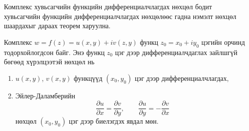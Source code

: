 Комплекс хувьсагчийн функцийн дифференциалчлагдах нөхцөл бодит хувьсагчийн функцийн дифференциалчлагдах нөхцөлөөс гадна нэмэлт нөхцөл шаардахыг дараах теорем харуулна.
\begin{thm}
Комплекс $w=f(z)=u(x,y)+iv (z,y)$ функц $z_0=x_0+iy_0$ цэгийн орчинд тодорхойлогдсон байг. Энэ функц $z_0$ цэг дээр дифференциалчдаглах зайлшгүй бөгөөд хүрэлцээтэй нөхцөл нь
\begin{enumerate}
    \item $u(x,y)$, $v(x,y)$ функцүүд $(x_0,y_0)$ цэг дээр дифференциалчлагдах,
    \item Эйлер-Даламберийн 
    \begin{equation}
\tag{E-D}
\dfrac{\partial u}{\partial x}=\dfrac{\partial v}{\partial y}, \qquad \dfrac{\partial u}{\partial y}=-\dfrac{\partial v}{\partial x}
\end{equation} нөхцөл $(x_0,y_0)$ цэг дээр биелэгдэх явдал мөн.
\end{enumerate}
\end{thm}
